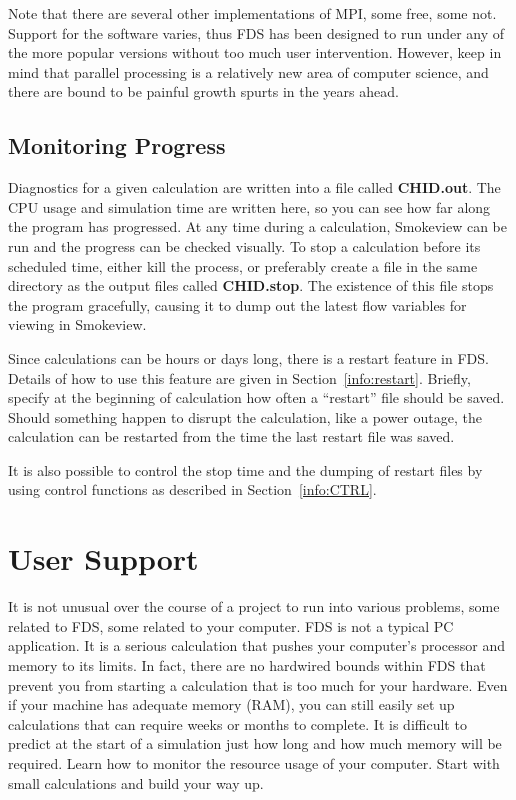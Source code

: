 \documentclass[11pt]{book}
\begin{document}
\begin{warning}
\noindent
Note that there are several other implementations of MPI, some free, some not.
Support for the software varies, thus FDS has been designed to run under any of the
more popular versions without too much user intervention. However, keep in mind
that parallel processing is a relatively new area of computer science,
and there are bound to be painful growth spurts in the years ahead.
\end{warning}


\section{Monitoring Progress}

Diagnostics for a given calculation are written into a file called {\bf CHID.out}.
The CPU usage and simulation time are written here, so you can see how
far along the program has progressed. At any time during a calculation,
Smokeview can be run and the progress can be checked visually.
To stop a calculation before its scheduled time, either
kill the process, or preferably create a file in the same directory as
the output files called {\bf CHID.stop}. The existence of this
file stops the program gracefully, causing it to dump out the
latest flow variables for viewing in Smokeview.

Since calculations can be hours or days long, there is a restart
feature in FDS. Details of how to use this feature
are given in Section~\ref{info:restart}. Briefly, specify at the
beginning of calculation how often a ``restart'' file should be saved.
Should something happen to disrupt the calculation, like a power
outage, the calculation can be restarted from the time the last restart
file was saved.

It is also possible to control the stop time and the dumping of restart files by using
control functions as described in Section~\ref{info:CTRL}.



\chapter{User Support}

It is not unusual over the course of a
project to run into various problems, some related to FDS, some related to your computer. FDS is not a typical PC application. It is a serious
calculation that pushes your computer's processor and memory to its limits. In fact, there are no hardwired bounds within FDS  that
prevent you from starting a calculation that is too much for your hardware.
Even if your machine has adequate memory (RAM), you can still easily set up calculations that can require
weeks or months to complete. It is difficult to predict at the start of a simulation just how long and how much memory will be required. Learn
how to monitor the resource usage of your computer. Start with small calculations and build your way up.
\end{document}
